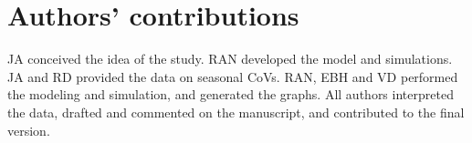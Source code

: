 \documentclass[rmp, reprint, superscriptaddress, floatfix,amsmath]{revtex4-1}
\begin{document}
\section*{Authors' contributions}
JA conceived the idea of the study. RAN developed the model and simulations. JA and RD provided the data on seasonal CoVs. RAN, EBH and VD performed the modeling and simulation, and generated the graphs. All authors interpreted the data, drafted and commented on the manuscript, and contributed to the final version. 



\newpage
\end{document}
